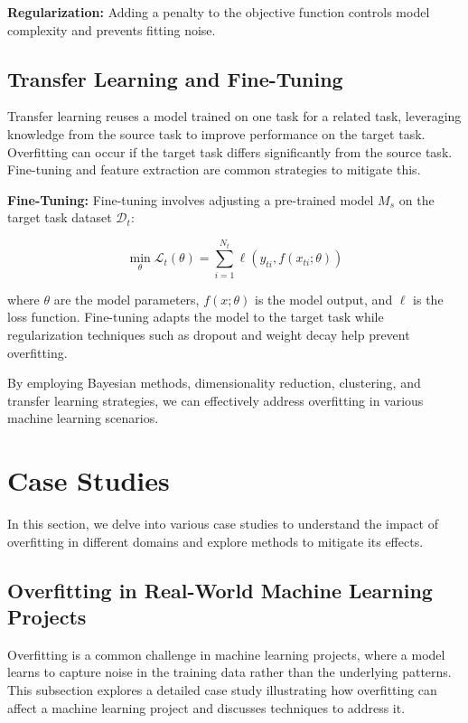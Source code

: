 \documentclass[12pt]{book} %
\begin{document}
\textbf{Regularization:} Adding a penalty to the objective function controls model complexity and prevents fitting noise.

\subsection{Transfer Learning and Fine-Tuning}

Transfer learning reuses a model trained on one task for a related task, leveraging knowledge from the source task to improve performance on the target task. Overfitting can occur if the target task differs significantly from the source task. Fine-tuning and feature extraction are common strategies to mitigate this.

\textbf{Fine-Tuning:} Fine-tuning involves adjusting a pre-trained model \( M_s \) on the target task dataset \( \mathcal{D}_t \):

\[
\min_{\theta} \mathcal{L}_t(\theta) = \sum_{i=1}^{N_t} \ell(y_{ti}, f(x_{ti}; \theta))
\]

where \( \theta \) are the model parameters, \( f(x; \theta) \) is the model output, and \( \ell \) is the loss function. Fine-tuning adapts the model to the target task while regularization techniques such as dropout and weight decay help prevent overfitting.

By employing Bayesian methods, dimensionality reduction, clustering, and transfer learning strategies, we can effectively address overfitting in various machine learning scenarios.

\section{Case Studies}

In this section, we delve into various case studies to understand the impact of overfitting in different domains and explore methods to mitigate its effects.

\subsection{Overfitting in Real-World Machine Learning Projects}

Overfitting is a common challenge in machine learning projects, where a model learns to capture noise in the training data rather than the underlying patterns. This subsection explores a detailed case study illustrating how overfitting can affect a machine learning project and discusses techniques to address it.
\end{document}
